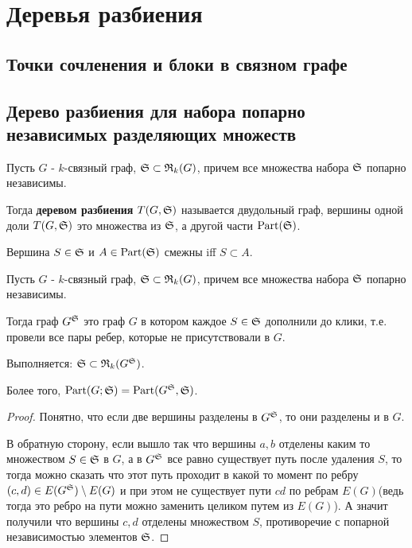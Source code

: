 \documentclass[../main.tex]{subfiles}
\begin{document}
\section{Деревья разбиения}

\subsection{Точки сочленения и блоки в связном графе}

\subsection{Дерево разбиения для набора попарно независимых разделяющих множеств}

\begin{df} \label{definition:tree_of_partition}
	Пусть $G$ - $k$-связный граф, $\S \subset \R_k(G)$, причем все множества набора $\S$ попарно независимы.

	Тогда \textbf{деревом разбиения} $T(G, \S)$ называется двудольный граф, вершины одной доли $T(G, \S)$ это множества из $\S$, а другой части $\Part(\S)$.

	Вершина $S \in \S$ и $A \in \Part(\S)$ смежны iff $S \subset A$.
\end{df}

\begin{df}
	Пусть $G$ - $k$-связный граф, $\S \subset \R_k(G)$, причем все множества набора $\S$ попарно независимы.

	Тогда граф $G^\S$ это граф $G$ в котором каждое $S \in \S$ дополнили до клики, т.е. провели все пары ребер, которые не присутствовали в $G$.
\end{df}

\begin{lm}[Лемма 1.1] \label{lemma:1_1}
	Выполняется: $\S \subset \R_k(G^\S)$.

	Более того, $\Part(G; \S) = \Part(G^\S, \S)$.
\end{lm}

\begin{proof}
	Понятно, что если две вершины разделены в $G^\S$, то они разделены и в $G$.

	В обратную сторону, если вышло так что вершины $a, b$ отделены каким то множеством $S \in \S$ в  $G$, а в  $G^\S$ все равно существует путь после удаления $S$, то тогда можно сказать что этот путь проходит в какой то момент по ребру  $(c,d) \in E(G^\S) \setminus E(G)$ и при этом не существует пути $cd$ по ребрам $E(G)$(ведь тогда это ребро на пути можно заменить целиком путем из $E(G)$).
	А значит получили что вершины $c, d$ отделены множеством $S$, противоречие с попарной независимостью элементов  $\S$.
\end{proof}
\end{document}
